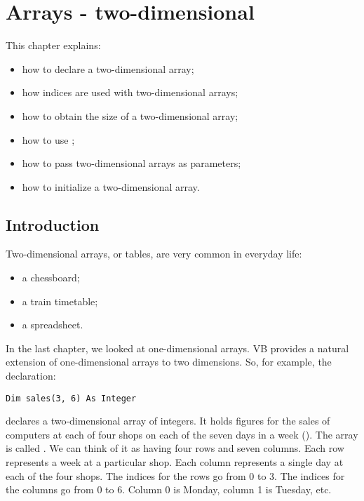 \chapter{Arrays - two-dimensional}
	\label{ch:arrays-2d}

	This chapter explains:
	\begin{itemize}
    \item how to declare a two-dimensional array;
    \item how indices are used with two-dimensional arrays;
    \item how to obtain the size of a two-dimensional array;
    \item how to use ;
    \item how to pass two-dimensional arrays as parameters;
    \item how to initialize a two-dimensional array.
	\end{itemize}


  \section{Introduction}
		Two-dimensional arrays, or tables, are very common in everyday life:
		\begin{itemize}
      \item a chessboard;
      \item a train timetable;
      \item a spreadsheet.
		\end{itemize}
		In the last chapter, we looked at one-dimensional arrays. VB provides a natural extension of one-dimensional arrays to two dimensions. So, for example, the declaration:
		\begin{lstlisting}
Dim sales(3, 6) As Integer
		\end{lstlisting}
		declares a two-dimensional array of integers. It holds figures for the sales of computers at each of four shops on each of the seven days in a week (). The array is called . We can think of it as having four rows and seven columns. Each row represents a week at a particular shop. Each column represents a single day at each of the four shops. The indices for the rows go from 0 to 3. The indices for the columns go from 0 to 6. Column 0 is Monday, column 1 is Tuesday, etc.
		

